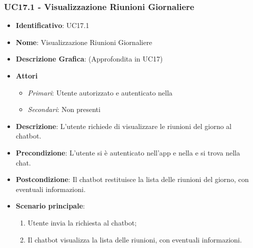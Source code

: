 \subsubsection{UC17.1 - Visualizzazione Riunioni Giornaliere }
\begin{itemize}
	\item \textbf{Identificativo}: UC17.1
	\item \textbf{Nome}: Visualizzazione Riunioni Giornaliere
	\item\textbf{Descrizione Grafica}: (Approfondita in UC17)
	\item \textbf{Attori}
	\begin{itemize} 
		\item \textit{Primari}: Utente autorizzato e autenticato nella 
		\item \textit{Secondari}: Non presenti
	\end{itemize}
	\item \textbf{Descrizione}: L'utente richiede di visualizzare le riunioni del giorno al chatbot.
	\item \textbf{Precondizione}: L'utente si è autenticato nell'app e nella  e si trova nella chat.
	\item \textbf{Postcondizione}: Il chatbot restituisce la lista delle riunioni del giorno, con eventuali informazioni.
	\item \textbf{Scenario principale}:  \begin{enumerate}
		\item Utente invia la richiesta al chatbot;
		\item Il chatbot visualizza la lista delle riunioni, con eventuali informazioni.
	\end{enumerate}
\end{itemize}


